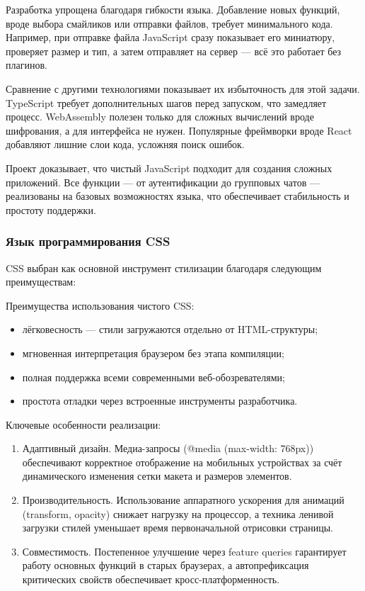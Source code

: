Разработка упрощена благодаря гибкости языка. Добавление новых функций, вроде выбора смайликов или отправки файлов, требует минимального кода. Например, при отправке файла JavaScript сразу показывает его миниатюру, проверяет размер и тип, а затем отправляет на сервер — всё это работает без плагинов.  

Сравнение с другими технологиями показывает их избыточность для этой задачи. TypeScript требует дополнительных шагов перед запуском, что замедляет процесс. WebAssembly полезен только для сложных вычислений вроде шифрования, а для интерфейса не нужен. Популярные фреймворки вроде React добавляют лишние слои кода, усложняя поиск ошибок.  

Проект доказывает, что чистый JavaScript подходит для создания сложных приложений. Все функции — от аутентификации до групповых чатов — реализованы на базовых возможностях языка, что обеспечивает стабильность и простоту поддержки.  

\subsubsection{Язык программирования CSS}

CSS выбран как основной инструмент стилизации благодаря следующим преимуществам:

Преимущества использования чистого CSS:
\begin{itemize}
	\item лёгковесность — стили загружаются отдельно от HTML-структуры;
	\item мгновенная интерпретация браузером без этапа компиляции;
	\item полная поддержка всеми современными веб-обозревателями;
	\item простота отладки через встроенные инструменты разработчика.
\end{itemize}

Ключевые особенности реализации:
\begin{enumerate}
	\item Адаптивный дизайн. Медиа-запросы (@media (max-width: 768px)) обеспечивают корректное отображение на мобильных устройствах за счёт динамического изменения сетки макета и размеров элементов.
	
	\item Производительность. Использование аппаратного ускорения для анимаций (transform, opacity) снижает нагрузку на процессор, а техника ленивой загрузки стилей уменьшает время первоначальной отрисовки страницы.
	
	\item Совместимость. Постепенное улучшение через feature queries гарантирует работу основных функций в старых браузерах, а автопрефиксация критических свойств обеспечивает кросс-платформенность.
\end{enumerate}


